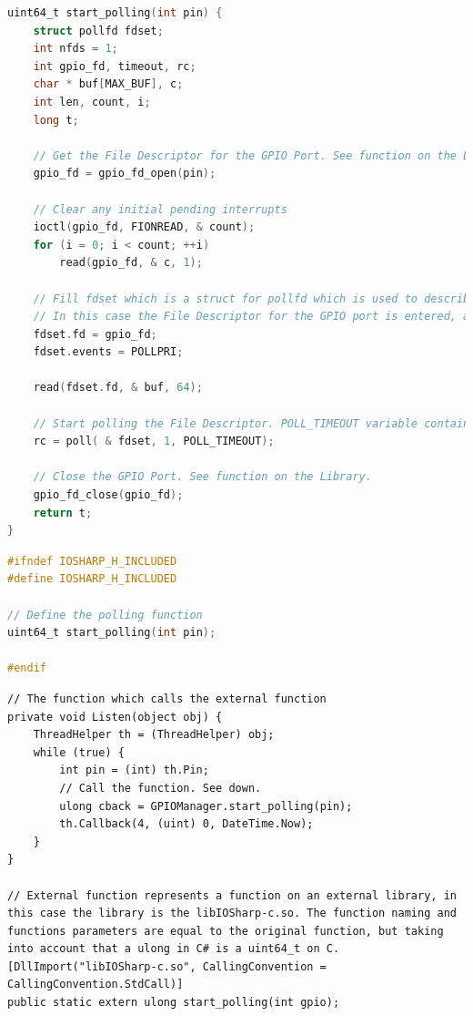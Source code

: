 \begin{lstlisting}[language=C, caption={IOSharp.c - Polling function}]
uint64_t start_polling(int pin) {
    struct pollfd fdset;
    int nfds = 1;
    int gpio_fd, timeout, rc;
    char * buf[MAX_BUF], c;
    int len, count, i;
    long t;

    // Get the File Descriptor for the GPIO Port. See function on the Library.
    gpio_fd = gpio_fd_open(pin);

    // Clear any initial pending interrupts
    ioctl(gpio_fd, FIONREAD, & count);
    for (i = 0; i < count; ++i)
        read(gpio_fd, & c, 1);

    // Fill fdset which is a struct for pollfd which is used to describe the polling system.
    // In this case the File Descriptor for the GPIO port is entered, and then the POLLPRI (Data Urgent to Read) is configured as the event type.
    fdset.fd = gpio_fd;
    fdset.events = POLLPRI;

    read(fdset.fd, & buf, 64);

    // Start polling the File Descriptor. POLL_TIMEOUT variable contains (-1) which stands for infinite blocking until event.
    rc = poll( & fdset, 1, POLL_TIMEOUT);

    // Close the GPIO Port. See function on the Library.
    gpio_fd_close(gpio_fd);
    return t;
}
\end{lstlisting}

\begin{lstlisting}[language=C, caption={IOSharp.h - Header file for the library}]
#ifndef IOSHARP_H_INCLUDED
#define IOSHARP_H_INCLUDED

// Define the polling function
uint64_t start_polling(int pin);

#endif
\end{lstlisting}

\begin{lstlisting}[language=CSharp, caption={GPIOManager.cs - P/Invoke section}]
// The function which calls the external function
private void Listen(object obj) {
    ThreadHelper th = (ThreadHelper) obj;
    while (true) {
        int pin = (int) th.Pin;
        // Call the function. See down.
        ulong cback = GPIOManager.start_polling(pin);
        th.Callback(4, (uint) 0, DateTime.Now);
    }
}

// External function represents a function on an external library, in this case the library is the libIOSharp-c.so. The function naming and functions parameters are equal to the original function, but taking into account that a ulong in C# is a uint64_t on C.
[DllImport("libIOSharp-c.so", CallingConvention = CallingConvention.StdCall)]
public static extern ulong start_polling(int gpio);
\end{lstlisting}

